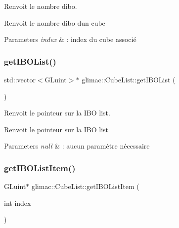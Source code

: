 Renvoit le nombre d\textquotesingle{}ibo. 

Renvoit le nombre d\textquotesingle{}ibo d\textquotesingle{}un cube


\begin{DoxyParams}{Parameters}
{\em index} & \+: index du cube associé \\
\hline
\end{DoxyParams}
\mbox{\label{classglimac_1_1CubeList_acd588ce7b0feb5f2fc72d6579887e47e}} 
\subsubsection{\texorpdfstring{get\+I\+B\+O\+List()}{getIBOList()}}
{\footnotesize\ttfamily std\+::vector$<$G\+Luint$>$$\ast$ glimac\+::\+Cube\+List\+::get\+I\+B\+O\+List (\begin{DoxyParamCaption}{ }\end{DoxyParamCaption})\hspace{0.3cm}{\ttfamily [inline]}}



Renvoit le pointeur sur la I\+BO list. 

Renvoit le pointeur sur la I\+BO list


\begin{DoxyParams}{Parameters}
{\em null} & \+: aucun paramètre nécessaire \\
\hline
\end{DoxyParams}
\mbox{\label{classglimac_1_1CubeList_a1b1b153b8b2171e65e9c040cfa424892}} 
\subsubsection{\texorpdfstring{get\+I\+B\+O\+List\+Item()}{getIBOListItem()}}
{\footnotesize\ttfamily G\+Luint$\ast$ glimac\+::\+Cube\+List\+::get\+I\+B\+O\+List\+Item (\begin{DoxyParamCaption}\item[{int}]{index }\end{DoxyParamCaption})\hspace{0.3cm}{\ttfamily [inline]}}



